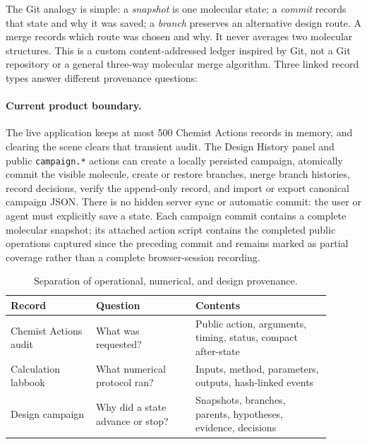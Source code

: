 The Git analogy is simple: a \emph{snapshot} is one molecular state; a
\emph{commit} records that state and why it was saved; a \emph{branch} preserves
an alternative design route. A merge records which route was chosen and why. It
never averages two molecular structures. This is a custom content-addressed
ledger inspired by Git, not a Git repository or a general three-way molecular
merge algorithm. Three linked record types answer different provenance
questions:

\paragraph{Current product boundary.}
The live application keeps at most 500 Chemist Actions records in memory, and
clearing the scene clears that transient audit. The Design History panel and
public \texttt{campaign.*} actions can create a locally persisted campaign,
atomically commit the visible molecule, create or restore branches, merge branch
histories, record decisions, verify the append-only record, and import or export
canonical campaign JSON. There is no hidden server sync or automatic commit:
the user or agent must explicitly save a state. Each campaign commit contains a
complete molecular snapshot; its attached action script contains the completed
public operations captured since the preceding commit and remains marked as
partial coverage rather than a complete browser-session recording.

\begin{table}[htbp]
  \centering
  \caption{Separation of operational, numerical, and design provenance.}
  \label{tab:design-records}
  \footnotesize
  \renewcommand{\arraystretch}{1.08}
  \begin{tabular}{@{}>{\raggedright\arraybackslash}p{0.24\linewidth}
                       >{\raggedright\arraybackslash}p{0.28\linewidth}
                       >{\raggedright\arraybackslash}p{0.38\linewidth}@{}}
    \toprule
    Record & Question & Contents \\
    \midrule
    Chemist Actions audit & What was requested? &
      Public action, arguments, timing, status, compact after-state \\
    Calculation labbook & What numerical protocol ran? &
      Inputs, method, parameters, outputs, hash-linked events \\
    Design campaign & Why did a state advance or stop? &
      Snapshots, branches, parents, hypotheses, evidence, decisions \\
    \bottomrule
  \end{tabular}
\end{table}

